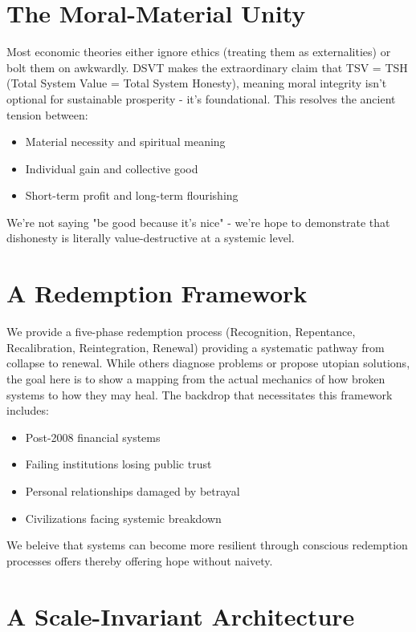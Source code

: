 \documentclass[11pt,oneside]{book}
\begin{document}
\section*{The Moral-Material Unity}

Most economic theories either ignore ethics (treating them as externalities) or bolt them on awkwardly. DSVT makes the extraordinary claim that TSV = TSH (Total System Value = Total System Honesty), meaning moral integrity isn't optional for sustainable prosperity - it's foundational. This resolves the ancient tension between:

\begin{itemize}
\item Material necessity and spiritual meaning
\item Individual gain and collective good
\item Short-term profit and long-term flourishing
\end{itemize}

We're not saying "be good because it's nice" - we're hope to demonstrate that dishonesty is literally value-destructive at a systemic level.

\section*{A Redemption Framework}

We provide a five-phase redemption process (Recognition, Repentance, Recalibration, Reintegration, Renewal) providing a systematic pathway from collapse to renewal.  While others diagnose problems or propose utopian solutions, the goal here is to show a mapping from the actual mechanics of how broken systems to how they may heal. The backdrop that necessitates this framework includes:

\begin{itemize}
\item Post-2008 financial systems
\item Failing institutions losing public trust
\item Personal relationships damaged by betrayal
\item Civilizations facing systemic breakdown
\end{itemize}

We beleive that systems can become more resilient through conscious redemption processes offers thereby offering hope without naivety.

\section*{A Scale-Invariant Architecture}
\end{document}
